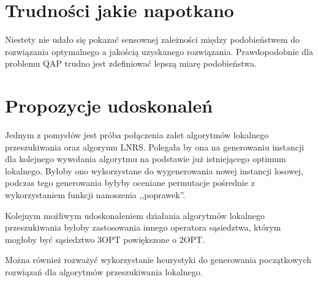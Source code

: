 \documentclass{article}
\begin{document}
\section{Trudności jakie napotkano}
Niestety nie udało się pokazać sensownej zależności między podobieństwem do rozwiązania optymalnego a jakością uzyskanego rozwiązania. Prawdopodobnie dla problemu QAP trudno jest zdefiniować lepszą miarę podobieństwa.

\section{Propozycje udoskonaleń}
Jednym z pomysłów jest próba połączenia zalet algorytmów lokalnego przeszukiwania oraz algorymu LNRS. Polegała by ona na generowaniu instancji dla kolejnego wywołania algorytmu na podstawie już istniejącego optimum lokalnego. Byłoby ono wykorzystane do wygenerowania nowej instancji losowej, podczas tego generowania byłyby oceniane permutacje pośrednie z wykorzystaniem funkcji nanoszenia ,,poprawek''.

Kolejnym możliwym udoskonaleniem działania algorytmów lokalnego przeszukiwania byłoby zastosowania innego operatora sąsiedztwa, którym mogłoby być sąsiedztwo 3OPT powiększone o 2OPT.

Można również rozważyć wykorzystanie heurystyki do generowania początkowych rozwiązań dla algorytmów przeszukiwania lokalnego.
\end{document}
